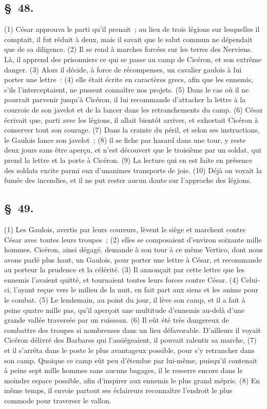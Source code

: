 \documentclass[french,twoside]{book} %
\begin{document}
\subsection[{§ 48.}]{ \textsc{§ 48.} }
\noindent (1) César approuva le parti qu’il prenait ; au lieu de trois légions sur lesquelles il comptait, il fut réduit à deux, mais il savait que le salut commun ne dépendait que de sa diligence. (2) Il se rend à marches forcées sur les terres des Nerviens. Là, il apprend des prisonniers ce qui se passe au camp de Cicéron, et son extrême danger. (3) Alors il décide, à force de récompenses, un cavalier gaulois à lui porter une lettre : (4) elle était écrite en caractères grecs, afin que les ennemis, s’ils l’interceptaient, ne pussent connaître nos projets. (5) Dans le cas où il ne pourrait parvenir jusqu’à Cicéron, il lui recommande d’attacher la lettre à la courroie de son javelot et de la lancer dans les retranchements du camp. (6) César écrivait que, parti avec les légions, il allait bientôt arriver, et exhortait Cicéron à conserver tout son courage. (7) Dans la crainte du péril, et selon ses instructions, le Gaulois lance son javelot ; (8) il se fiche par hasard dans une tour, y reste deux jours sans être aperçu, et n’est découvert que le troisième par un soldat, qui prend la lettre et la porte à Cicéron. (9) La lecture qui en est faite en présence des soldats excite parmi eux d’unanimes transports de joie. (10) Déjà on voyait la fumée des incendies, et il ne put rester aucun doute sur l’approche des légions.
\subsection[{§ 49.}]{ \textsc{§ 49.} }
\noindent (1) Les Gaulois, avertis par leurs coureurs, lèvent le siège et marchent contre César avec toutes leurs troupes ; (2) elles se composaient d’environ soixante mille hommes. Cicéron, ainsi dégagé, demande à son tour à ce même Vertico, dont nous avons parlé plus haut, un Gaulois, pour porter une lettre à César, et recommande au porteur la prudence et la célérité. (3) Il annonçait par cette lettre que les ennemis l’avaient quitté, et tournaient toutes leurs forces contre César. (4) Celui-ci, l’ayant reçue vers le milieu de la nuit, en fait part aux siens et les anime pour le combat. (5) Le lendemain, au point du jour, il lève son camp, et il a fait à peine quatre mille pas, qu’il aperçoit une multitude d’ennemis au-delà d’une grande vallée traversée par un ruisseau. (6) Il eût été très dangereux de combattre des troupes si nombreuses dans un lieu défavorable. D'ailleurs il voyait Cicéron délivré des Barbares qui l’assiégeaient, il pouvait ralentir sa marche, (7) et il s’arrêta dans le poste le plus avantageux possible, pour s’y retrancher dans son camp. Quoique ce camp eût peu d’étendue par lui-même, puisqu’il contenait à peine sept mille hommes sans aucuns bagages, il le resserre encore dans le moindre espace possible, afin d’inspirer aux ennemis le plus grand mépris. (8) En même temps, il envoie partout ses éclaireurs reconnaître l’endroit le plus commode pour traverser le vallon.
\end{document}
